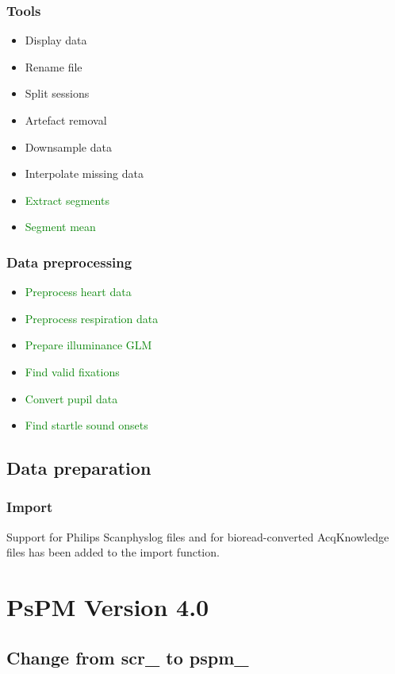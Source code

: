 \documentclass[english]{article}
\numberwithin{equation}{section}
\numberwithin{figure}{section}
\begin{document}
\subsubsection*{Tools}
\begin{itemize}
\item Display data
\item Rename file
\item Split sessions
\item Artefact removal
\item Downsample data
\item Interpolate missing data
\item \textcolor{green}{Extract segments}
\item \textcolor{green}{Segment mean}
\end{itemize}

\subsubsection*{Data preprocessing}
\begin{itemize}
\item \textcolor{green}{Preprocess heart data}
\item \textcolor{green}{Preprocess respiration data}
\item \textcolor{green}{Prepare illuminance GLM}
\item \textcolor{green}{Find valid fixations}
\item \textcolor{green}{Convert pupil data}
\item \textcolor{green}{Find startle sound onsets}
\end{itemize}

\subsection*{Data preparation}

\subsubsection*{Import}

Support for Philips Scanphyslog files and for bioread-converted AcqKnowledge
files has been added to the import function.

\section{PsPM Version 4.0}

\subsection*{Change from scr\_ to pspm\_}
\end{document}
